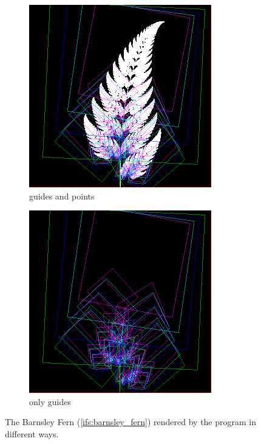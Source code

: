 \documentclass[11pt]{article}
\begin{document}
\begin{figure}
\begin{subfigure}[b]{0.3\textwidth}
         \includegraphics[width=\textwidth]{figures/barnsley_guides_and_points}
         \caption{guides and points}
         \label{figure:barnsley_guides_and_points}
     \end{subfigure}
     \hfill
     \begin{subfigure}[b]{0.3\textwidth}
         \centering
         \includegraphics[width=\textwidth]{figures/barnsley_guides}
         \caption{only guides}
         \label{figure:barnsley_guides}
     \end{subfigure}
        \caption{The Barnsley Fern (\autoref{ifs:barnsley_fern}) rendered by the program in different ways.}
        \label{figure:barnsley_guides_vs_points}
\end{figure}
\end{document}

